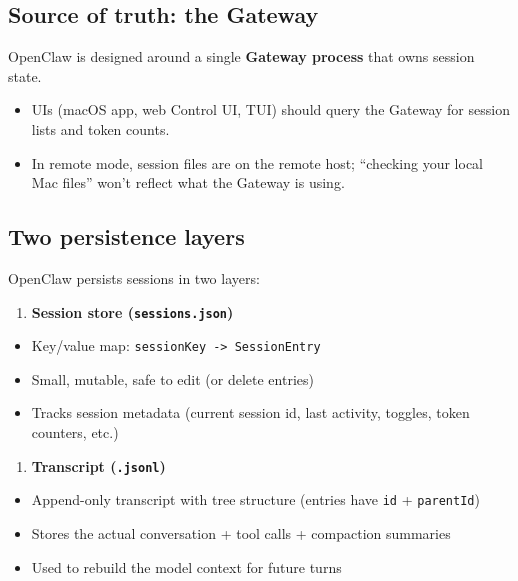 \subsection{Source of truth: the Gateway}


OpenClaw is designed around a single \textbf{Gateway process} that owns session state.

\begin{itemize}
  \item UIs (macOS app, web Control UI, TUI) should query the Gateway for session lists and token counts.
  \item In remote mode, session files are on the remote host; “checking your local Mac files” won’t reflect what the Gateway is using.
\end{itemize}


\hrulefill


\subsection{Two persistence layers}


OpenClaw persists sessions in two layers:

\begin{enumerate}
  \item \textbf{Session store (\texttt{sessions.json})}
\end{enumerate}

\begin{itemize}
  \item Key/value map: \texttt{sessionKey -> SessionEntry}
  \item Small, mutable, safe to edit (or delete entries)
  \item Tracks session metadata (current session id, last activity, toggles, token counters, etc.)
\end{itemize}


\begin{enumerate}
  \item \textbf{Transcript (\texttt{.jsonl})}
\end{enumerate}

\begin{itemize}
  \item Append-only transcript with tree structure (entries have \texttt{id} + \texttt{parentId})
  \item Stores the actual conversation + tool calls + compaction summaries
  \item Used to rebuild the model context for future turns
\end{itemize}


